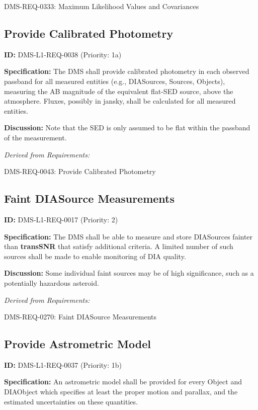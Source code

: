 \documentclass[SE,toc,lsstdraft]{lsstdoc}
\begin{document}
DMS-REQ-0333:
Maximum Likelihood Values and Covariances \newline

\subsection{Provide Calibrated Photometry}

\label{DMS-L1-REQ-0038}
\textbf{ID:} DMS-L1-REQ-0038 (Priority: 1a)

\textbf{Specification:} The DMS shall provide calibrated photometry in each observed passband for all measured entities (e.g., DIASources, Sources, Objects), measuring the AB magnitude of the equivalent flat-SED source, above the atmosphere. Fluxes, possibly in jansky, shall be calculated for all measured entities.

\textbf{Discussion: }Note that the SED is only assumed to be flat within the passband of the measurement.

\emph{Derived from Requirements:}

DMS-REQ-0043:
Provide Calibrated Photometry \newline

\subsection{Faint DIASource Measurements}

\label{DMS-L1-REQ-0017}
\textbf{ID:} DMS-L1-REQ-0017 (Priority: 2)

\textbf{Specification:} The DMS shall be able to measure and store DIASources fainter than \textbf{transSNR }that satisfy additional criteria. A limited number of such sources shall be made to enable monitoring of DIA quality.

\textbf{Discussion: }Some individual faint sources may be of high significance, such as a potentially hazardous asteroid.

\emph{Derived from Requirements:}

DMS-REQ-0270:
Faint DIASource Measurements \newline

\subsection{Provide Astrometric Model}

\label{DMS-L1-REQ-0037}
\textbf{ID:} DMS-L1-REQ-0037 (Priority: 1b)

\textbf{Specification:} An astrometric model shall be provided for every Object and DIAObject which specifies at least the proper motion and parallax, and the estimated uncertainties on these quantities.
\end{document}
